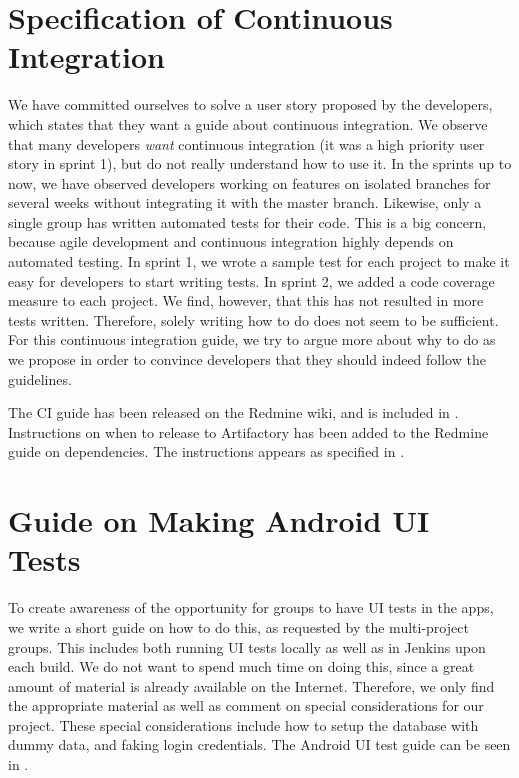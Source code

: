 \section{Specification of Continuous Integration}\label{sec:specsCI}
We have committed ourselves to solve a user story proposed by the developers, which states that they want a guide about continuous integration. We observe that many developers \emph{want} continuous integration (it was a high priority user story in sprint 1), but do not really understand how to use it. In the sprints up to now, we have observed developers working on features on isolated branches for several weeks without integrating it with the master branch. Likewise, only a single group has written automated tests for their code. This is a big concern, because agile development and continuous integration highly depends on automated testing. In sprint 1, we wrote a sample test for each project to make it easy for developers to start writing tests. In sprint 2, we added a code coverage measure to each project. We find, however, that this has not resulted in more tests written. Therefore, solely writing how to do does not seem to be sufficient. For this continuous integration guide, we try to argue more about why to do as we propose in order to convince developers that they should indeed follow the guidelines.

The CI guide has been released on the Redmine wiki, and is included in . Instructions on when to release to Artifactory has been added to the Redmine guide on dependencies. The instructions appears as specified in .

\section{Guide on Making Android UI Tests}\label{sec:uitestguide}
To create awareness of the opportunity for groups to have UI tests in the apps, we write a short guide on how to do this, as requested by the multi-project groups. This includes both running UI tests locally as well as in Jenkins upon each build. We do not want to spend much time on doing this, since a great amount of material is already available on the Internet. Therefore, we only find the appropriate material as well as comment on special considerations for our project. These special considerations include how to setup the database with dummy data, and faking login credentials. The Android UI test guide can be seen in .